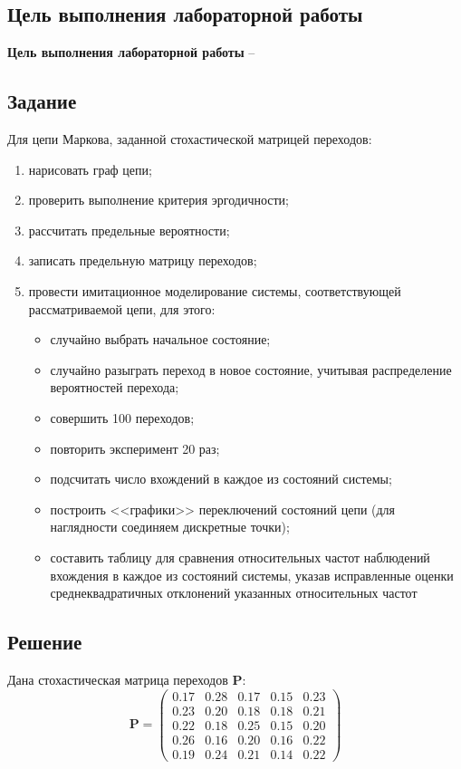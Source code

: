 \subsection{Цель выполнения лабораторной работы}\label{blockN.VariantM}
\textbf{Цель выполнения лабораторной работы }-- \GoalOfResearch

\subsection{Задание}
Для цепи Маркова, заданной стохастической матрицей переходов: 
\begin{enumerate}
    \item нарисовать граф цепи; 
    \item проверить выполнение критерия эргодичности;
    \item рассчитать предельные вероятности;
    \item записать предельную матрицу переходов; 
    \item провести имитационное моделирование системы, соответствующей рассматриваемой цепи, для этого: 
    \begin{itemize}
        \item случайно выбрать начальное состояние; 
        \item случайно разыграть переход в новое состояние, учитывая распределение вероятностей перехода; 
        \item совершить 100 переходов; 
        \item повторить эксперимент 20 раз; 
        \item подсчитать число вхождений в каждое из состояний системы;
        \item  построить <<графики>> переключений состояний цепи (для наглядности соединяем дискретные точки); 
        \item составить таблицу для сравнения относительных частот наблюдений вхождения в каждое из состояний системы, указав исправленные оценки среднеквадратичных отклонений указанных относительных частот
    \end{itemize}
\end{enumerate}
\newpage
\subsection{Решение}
Дана стохастическая матрица переходов $\mathbf{P}$:
$$\mathbf{P}=\begin{pmatrix}
0.17& 0.28& 0.17& 0.15& 0.23\\
0.23& 0.20& 0.18& 0.18& 0.21\\
0.22& 0.18& 0.25& 0.15& 0.20\\
0.26& 0.16& 0.20& 0.16& 0.22\\
0.19& 0.24& 0.21& 0.14& 0.22
\end{pmatrix}$$

